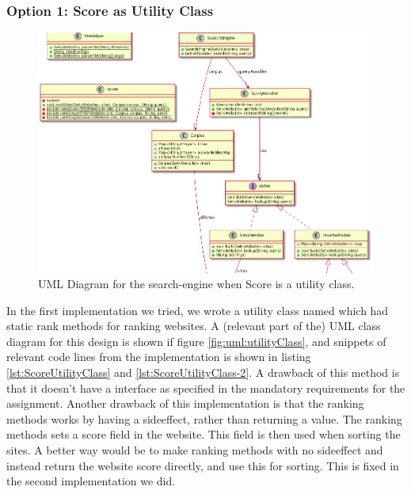 \subsubsection{Option 1: Score as Utility Class}
\begin{figure}[t]
	\centering
	\includegraphics[width=\textwidth]{graphics/uml/ScoreAsUtilityZoom.png}
	\caption{UML Diagram for the search-engine when Score is a utility class.}
	\label{fig:uml:ScoreAsUtility}
\end{figure}

In the first implementation we tried, we wrote a utility class named  which had static rank methods for ranking websites.   
A (relevant part of the) UML class diagram for this design is shown if figure \ref{fig:uml:utilityClass}, and snippets of relevant code lines from the implementation is shown in listing \ref{lst:ScoreUtilityClass} and \ref{lst:ScoreUtilityClass-2}. 
A drawback of this method is that it doesn't have a  interface as specified in the mandatory requirements for the assignment.
Another drawback of this implementation is that the ranking methods works by having a sideeffect, rather than returning a value. The ranking methods sets a score field in the website. This field is then used when sorting the sites. A better way would be to make ranking methods with no sideeffect and instead return the website score directly, and use this for sorting. This is fixed in the second implementation we did.      

